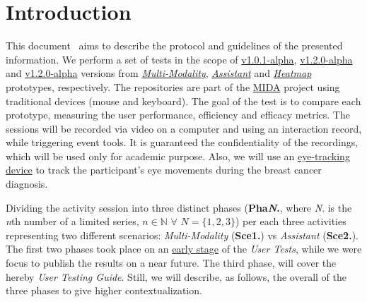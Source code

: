 
\section{Introduction}
\label{sec:sec001}

This document~\cite{francisco_maria_calisto_2019_2639038} aims to describe the protocol and guidelines of the presented information. We perform a set of tests in the scope of \hyperlink{https://github.com/MIMBCD-UI/prototype-multi-modality/releases/tag/v1.0.1-alpha}{v1.0.1-alpha}, \hyperlink{https://github.com/mida-project/prototype-multi-modality-assistant/releases/tag/v1.2.0-alpha}{v1.2.0-alpha} and \hyperlink{https://github.com/mida-project/prototype-heatmap/releases/tag/v1.2.0-alpha}{v1.2.0-alpha} versions from {\it \hyperlink{https://github.com/MIMBCD-UI/prototype-multi-modality}{Multi-Modality}}, {\it \hyperlink{https://github.com/mida-project/prototype-multi-modality-assistant}{Assistant}} and {\it \hyperlink{https://github.com/mida-project/prototype-heatmap}{Heatmap}} prototypes, respectively. The repositories are part of the \hyperlink{https://mida-project.github.io/}{MIDA} project using traditional devices (mouse and keyboard). The goal of the test is to compare each prototype, measuring the user performance, efficiency and efficacy metrics. The sessions will be recorded via video on a computer and using an interaction record, while triggering event tools. It is guaranteed the confidentiality of the recordings, which will be used only for academic purpose. Also, we will use an \hyperlink{https://gaming.tobii.com/products/}{eye-tracking device} to track the participant's eye movements during the breast cancer diagnosis.

Dividing the activity session into three distinct phases (\textbf{Pha\textit{N}.}, where \textit{N}. is the \textit{n}th number of a limited series, $n \in \mathbb{N}$ $\forall$ $N = \{1, 2, 3\}$) per each three activities representing two different scenarios: \textit{Multi-Modality} (\textbf{Sce1.}) vs \textit{Assistant} (\textbf{Sce2.}). The first two phases took place on an \hyperlink{https://github.com/MIMBCD-UI/testing-guide-breast/tree/master/samples/test_4}{early stage} of the \textit{User Tests}, while we were focus to publish the results on a near future. The third phase, will cover the hereby \textit{User Testing Guide}. Still, we will describe, as follows, the overall of the three phases to give higher contextualization.

